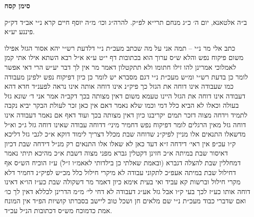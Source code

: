 \documentclass[12pt, openany]{book}
\newcommand{\chapname}{}
\newcommand{\newchap}[1]{
	\addcontentsline{toc}{chapter}{#1}
	\renewcommand{\chapname}{#1}
		\begin{center}
			\textbf{%
\fontsize{16pt}{16pt}\selectfont
				#1}
		\end{center}
}
\begin{document}
\newchap{סימן קסח}
\begin{multicols}{2}
ב״ה אלטאנא, יום ה׳ כ״ג מנחם תרי״א לפ״ק. להרה״ג וכו׳ מ״ה יוסף חיים קרא נ״י אב״ד דק״ק פיננע יע״א.\\\vspace{0pt}

כתב אלי מר נ״י – תמה אני על מה שכתב מעכ״ת נ״י דלדעת רש״י יהא אסור הגזל אפילו משום פיקוח נפש והלא ש״ס ערוך הוא בכתובות דף י״ט ע״א א״ל רבא השתא אילו אתי קמן לאמלוכי אמרינן להו זילו חתומו ולא תתקטלון דאמר מר אין לך דבר יע״ש הרי דאי אפשר לומר כן בדעת רש״י ומ״ש מעכ״ת נ״י דגם מסברא יש לומר כן כיון דפיקוח נפש ילפינן מעבודה כמו שעבודה אינו דוחה את הגזל כך פיק״נ אינו דוחה אותה אינו נראה לפענ״ד חדא דהא דעבודה אינו דוחה את הגזל היינו טעמא משום דאין מצותה בכך דקב״ה אמר אני ד׳ שונא גזל בעולה וכאלו לא הביא כלל דמי וכמו שלא נאמר דאם אין כאן זכר לעולת הבקר יביא נקבה לתמיד וידחה מצוה דזכר תמים יקריבנו כיון דאין מצותה בכך ועוד דאף אם נאמר דעבודה אינו דוחה גזל מאין הרגלים לומר דפיקוח נפש דחמיר מיני׳ דדוחה עבודה שאינו דוחה גזל ג״כ וא״ל מדשאלו התנאים אלו מניין לפיק״נ שדוחה שבת מכלל דצריך לימוד דוקא א״כ לגבי גזל דליכא ק״ו עכ״פ אין ראי׳ דידחה ז״א דעד כאן לא שאלו אלו התנאים רק מנ״ל דידחה שבת דכיון דאיסור שבת במיתה א״כ חזינן דקטלין גברא מפני מצוה דשבת א״כ מהיכא תיתי נאמר דמחללין שבת להצלה דגברא (ובאמת שאלתי כן בילדותי לאאמ״ו ז״ל) ע״ז הוכיח הש״ס אף דחילול שבת במיתה אעפ״כ לתקוני עבודה לא מיקרי חילול כלל מכ״ש לפיק״נ דחמיר דלא מקרי חילול וברשות קא עביד ואי בעית אימא כיון דאמר מר דשקולה שבת כע״ז הו״א דאינו דוחה אותו כע״ז לכך בעי ק״ו אבל גזל אע״ג דעבודה לא דחי לי׳ מ״מ הדרינן לכללא דאין לך כו׳ ואם שדברי כבוד מעכ״ת נ״י שם מלאים חן ושכל טוב ליישב בסברתו קושיות הפ״ד אין המונח אמת כדמוכח מש״ס דכתובות הנ״ל עכ״ד.\\\vspace{0pt}


\end{multicols}
\end{document}
